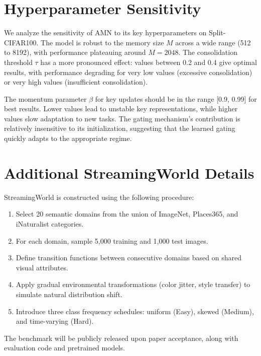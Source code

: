 \documentclass[11pt]{article}
\begin{document}
\section{Hyperparameter Sensitivity}
\label{app:hyperparams}

We analyze the sensitivity of AMN to its key hyperparameters on Split-CIFAR100. The model is robust to the memory size $M$ across a wide range (512 to 8192), with performance plateauing around $M = 2048$. The consolidation threshold $\tau$ has a more pronounced effect: values between 0.2 and 0.4 give optimal results, with performance degrading for very low values (excessive consolidation) or very high values (insufficient consolidation).

The momentum parameter $\beta$ for key updates should be in the range [0.9, 0.99] for best results. Lower values lead to unstable key representations, while higher values slow adaptation to new tasks. The gating mechanism's contribution is relatively insensitive to its initialization, suggesting that the learned gating quickly adapts to the appropriate regime.

\section{Additional StreamingWorld Details}
\label{app:streaming}

StreamingWorld is constructed using the following procedure:
\begin{enumerate}
    \item Select 20 semantic domains from the union of ImageNet, Places365, and iNaturalist categories.
    \item For each domain, sample 5,000 training and 1,000 test images.
    \item Define transition functions between consecutive domains based on shared visual attributes.
    \item Apply gradual environmental transformations (color jitter, style transfer) to simulate natural distribution shift.
    \item Introduce three class frequency schedules: uniform (Easy), skewed (Medium), and time-varying (Hard).
\end{enumerate}

The benchmark will be publicly released upon paper acceptance, along with evaluation code and pretrained models.
\end{document}
